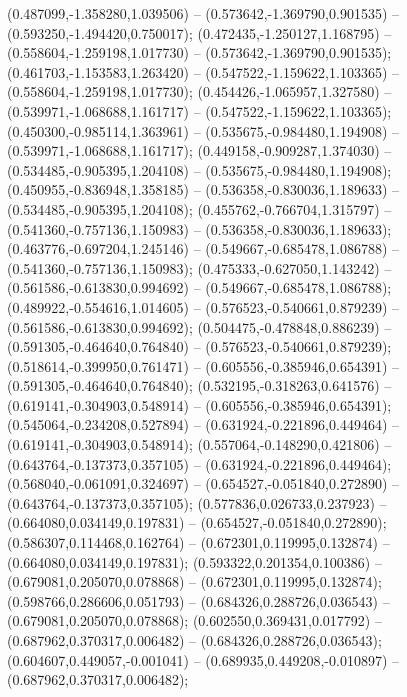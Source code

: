  (0.487099,-1.358280,1.039506) -- (0.573642,-1.369790,0.901535) -- (0.593250,-1.494420,0.750017);
 (0.472435,-1.250127,1.168795) -- (0.558604,-1.259198,1.017730) -- (0.573642,-1.369790,0.901535);
 (0.461703,-1.153583,1.263420) -- (0.547522,-1.159622,1.103365) -- (0.558604,-1.259198,1.017730);
 (0.454426,-1.065957,1.327580) -- (0.539971,-1.068688,1.161717) -- (0.547522,-1.159622,1.103365);
 (0.450300,-0.985114,1.363961) -- (0.535675,-0.984480,1.194908) -- (0.539971,-1.068688,1.161717);
 (0.449158,-0.909287,1.374030) -- (0.534485,-0.905395,1.204108) -- (0.535675,-0.984480,1.194908);
 (0.450955,-0.836948,1.358185) -- (0.536358,-0.830036,1.189633) -- (0.534485,-0.905395,1.204108);
 (0.455762,-0.766704,1.315797) -- (0.541360,-0.757136,1.150983) -- (0.536358,-0.830036,1.189633);
 (0.463776,-0.697204,1.245146) -- (0.549667,-0.685478,1.086788) -- (0.541360,-0.757136,1.150983);
 (0.475333,-0.627050,1.143242) -- (0.561586,-0.613830,0.994692) -- (0.549667,-0.685478,1.086788);
 (0.489922,-0.554616,1.014605) -- (0.576523,-0.540661,0.879239) -- (0.561586,-0.613830,0.994692);
 (0.504475,-0.478848,0.886239) -- (0.591305,-0.464640,0.764840) -- (0.576523,-0.540661,0.879239);
 (0.518614,-0.399950,0.761471) -- (0.605556,-0.385946,0.654391) -- (0.591305,-0.464640,0.764840);
 (0.532195,-0.318263,0.641576) -- (0.619141,-0.304903,0.548914) -- (0.605556,-0.385946,0.654391);
 (0.545064,-0.234208,0.527894) -- (0.631924,-0.221896,0.449464) -- (0.619141,-0.304903,0.548914);
 (0.557064,-0.148290,0.421806) -- (0.643764,-0.137373,0.357105) -- (0.631924,-0.221896,0.449464);
 (0.568040,-0.061091,0.324697) -- (0.654527,-0.051840,0.272890) -- (0.643764,-0.137373,0.357105);
 (0.577836,0.026733,0.237923) -- (0.664080,0.034149,0.197831) -- (0.654527,-0.051840,0.272890);
 (0.586307,0.114468,0.162764) -- (0.672301,0.119995,0.132874) -- (0.664080,0.034149,0.197831);
 (0.593322,0.201354,0.100386) -- (0.679081,0.205070,0.078868) -- (0.672301,0.119995,0.132874);
 (0.598766,0.286606,0.051793) -- (0.684326,0.288726,0.036543) -- (0.679081,0.205070,0.078868);
 (0.602550,0.369431,0.017792) -- (0.687962,0.370317,0.006482) -- (0.684326,0.288726,0.036543);
 (0.604607,0.449057,-0.001041) -- (0.689935,0.449208,-0.010897) -- (0.687962,0.370317,0.006482);
